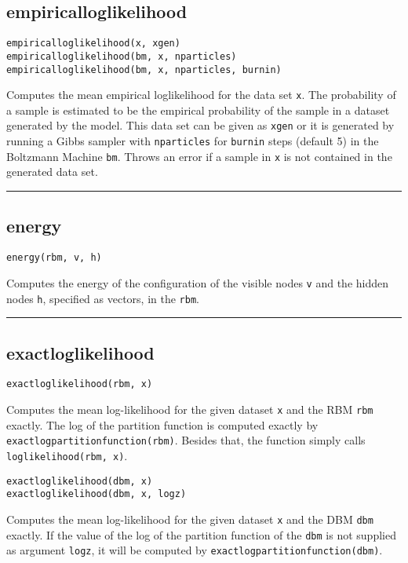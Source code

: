 \subsection*{empiricalloglikelihood}
\begin{verbatim}
empiricalloglikelihood(x, xgen)
empiricalloglikelihood(bm, x, nparticles)
empiricalloglikelihood(bm, x, nparticles, burnin)
\end{verbatim}
Computes the mean empirical loglikelihood for the data set \texttt{x}. The probability of a sample is estimated to be the empirical probability of the sample in a dataset generated by the model. This data set can be given as \texttt{xgen} or it is generated by running a Gibbs sampler with \texttt{nparticles} for \texttt{burnin} steps (default 5) in the Boltzmann Machine \texttt{bm}. Throws an error if a sample in \texttt{x} is not contained in the generated data set.

\noindent\rule{\textwidth}{1pt}
\subsection*{energy}
\begin{verbatim}
energy(rbm, v, h)
\end{verbatim}
Computes the energy of the configuration of the visible nodes \texttt{v} and the hidden nodes \texttt{h}, specified as vectors, in the \texttt{rbm}.

\noindent\rule{\textwidth}{1pt}
\subsection*{exactloglikelihood}
\begin{verbatim}
exactloglikelihood(rbm, x)
\end{verbatim}
Computes the mean log-likelihood for the given dataset \texttt{x} and the RBM \texttt{rbm} exactly. The log of the partition function is computed exactly by \texttt{exactlogpartitionfunction(rbm)}. Besides that, the function simply calls \texttt{loglikelihood(rbm, x)}.

\begin{verbatim}
exactloglikelihood(dbm, x)
exactloglikelihood(dbm, x, logz)
\end{verbatim}
Computes the mean log-likelihood for the given dataset \texttt{x} and the DBM \texttt{dbm} exactly. If the value of the log of the partition function of the \texttt{dbm} is not supplied as argument \texttt{logz}, it will be computed by \texttt{exactlogpartitionfunction(dbm)}.

